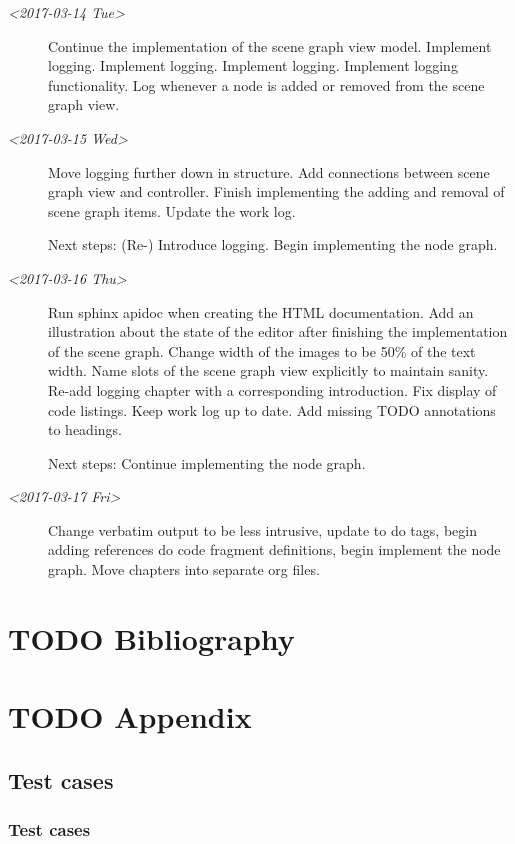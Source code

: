 \documentclass[10pt, openright, notitlepage]{scrreprt}
\begin{document}
\begin{description}
\item[{\textit{<2017-03-14 Tue>}}] Continue the implementation of the scene graph view model.
Implement logging. Implement logging. Implement logging. Implement logging
functionality. Log whenever a node is added or removed from the scene graph
view.

\item[{\textit{<2017-03-15 Wed>}}] Move logging further down in structure. Add connections
between scene graph view and controller. Finish implementing the adding and
removal of scene graph items. Update the work log.

Next steps: (Re-) Introduce logging. Begin implementing the node graph.

\item[{\textit{<2017-03-16 Thu>}}] Run sphinx apidoc when creating the HTML documentation.
Add an illustration about the state of the editor after finishing the
implementation of the scene graph. Change width of the images to be 50\% of
the text width. Name slots of the scene graph view explicitly to maintain
sanity. Re-add logging chapter with a corresponding introduction. Fix display
of code listings. Keep work log up to date. Add missing TODO annotations to
headings.

Next steps: Continue implementing the node graph.

\item[{\textit{<2017-03-17 Fri>}}] Change verbatim output to be less intrusive, update to do
tags, begin adding references do code fragment definitions, begin implement
the node graph. Move chapters into separate org files.
\end{description}
\chapter{{\bfseries\sffamily TODO} Bibliography}
\label{sec:org6039ead}
\printbibliography{}
\chapter{{\bfseries\sffamily TODO} Appendix}
\label{sec:orgc665fc1}
\section{Test cases}
\label{sec:org0c1598a}
\subsection{Test cases}
\label{sec:org08e93bd}
\end{document}
